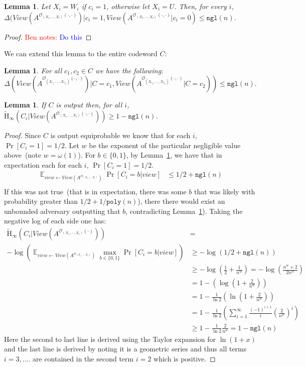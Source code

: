 \documentclass[11pt]{article}
\newcommand{\lemref}[1]{\mbox{Lemma~\ref{#1}}}
\DeclareMathOperator*{\expe}{\mathbb{E}}
\newcommand{\poly}{\ensuremath{\mathtt{poly}}\xspace}
\newcommand{\ngl}{\ensuremath{\mathtt{ngl}}\xspace}
\newcommand{\Hav}{\tilde{\mathrm{H}}_\infty}
\newtheorem{lemma}[theorem]{Lemma}
\newcommand{\authnote}[2]{{\textcolor{red}{\textsf{#1 notes: }\textcolor{blue}{ #2}}\marginpar{\textcolor{red}{\textbf{!!!!!}}}}}
\newcommand{\authnote}[2]{}
\newcommand{\bnote}[1]{{\authnote{Ben}{#1}}}
\begin{document}
\begin{lemma}
\label{lem:code bits statistically indist}
Let $X_i = W_i$ if $c_i = 1$, otherwise let $X_i = U$.  Then, for every $i$, $\Delta(View(A^{\mathcal{O}_{(X_1,..., X_\ell)}(\cdot, \cdot)})| c_i = 1, View(A^{\mathcal{O}_{(X_1,..., X_\ell)}(\cdot, \cdot)} | c_i =0) \leq \ngl(n)$.
\end{lemma}
\begin{proof}
\bnote{Do this}
\end{proof}
We can extend this lemma to the entire codeword $C$:
\begin{lemma}
For all $c_1, c_2 \in C$ we have the following: 
\[
\Delta(View(A^{\mathcal{O}_{(X_{c_{1_1}},..., X_{c_{2_\ell}})}(\cdot, \cdot)})| C = c_1, View(A^{\mathcal{O}_{(X_{c_{2_1}},..., X_{c_{2_\ell}})}(\cdot, \cdot)} | C = c_2)) \leq \ngl(n).
\]
\end{lemma}
\begin{lemma}
If $C$ is output then, for all $i$, $\Hav(C_i |View(A^{\mathcal{O}_{(X_1,..., X_\ell)}(\cdot, \cdot)}))\geq 1 - \ngl(n)$.
\end{lemma}
\begin{proof}
Since $C$ is output equiprobable we know that for each $i$, $\Pr[C_i =1 ] = 1/2$.  Let $w$ be the exponent of the particular negligible value above~(note $w = \omega(1)$).  For $b\in\{0,1\}$, by \lemref{lem:code bits statistically indist}, we have that in expectation each for each $i$, $\Pr[C_i =1 ] = 1/2$. 
\begin{align*}
\expe_{view \leftarrow View(A^{\mathcal{O}_{(X_1,..., X_\ell)}})}\Pr[C_i =b | view ] &\leq 1/2 + \ngl(n)\\
\end{align*}
If this was not true~(that is in expectation, there was some $b$ that was likely with probability greater than $1/2+1/\poly(n)$), there there would exist an unbounded adversary outputting that $b$, contradicting \lemref{lem:code bits statistically indist}).  
Taking the negative log of each side one has:
\begin{align*}
\Hav(C_i |  View(A^{\mathcal{O}_{(X_1,..., X_\ell)}(\cdot)}))
 &=\\-\log \left(\expe_{view \leftarrow View(A^{\mathcal{O}_{(X_1,..., X_\ell)}})}\max_{b\in\{0,1\}}\Pr[C_i =b | view ]  \right) &\geq -\log (1/2 + \ngl(n))\\
&\geq -\log(\frac{1}{2} + \frac{1}{n^{w}} )= -\log \left(\frac{n^{w}+2}{2n^{w}}\right)\\
&=1-\left(\log (1+\frac{2}{n^w}) \right)\\
&=1-\frac{1}{\ln 2}\left(\ln (1+\frac{2}{n^w}) \right)\\
&= 1- \frac{1}{\ln 2}\left(\sum_{i=1}^\infty \frac{(-1)^{i+1}}{i} (\frac{2}{n^w})^i\right) \\
&\geq 1 - \frac{1}{\ln 2} \frac{2}{n^w} = 1-\ngl(n)
\end{align*}
Here the second to last line is derived using the Taylor expansion for $\ln(1+x)$ and the last line is derived by noting it is a geometric series and thus all terms $i=3,....$ are contained in the second term $i=2$ which is positive.
\end{proof}
\end{document}
